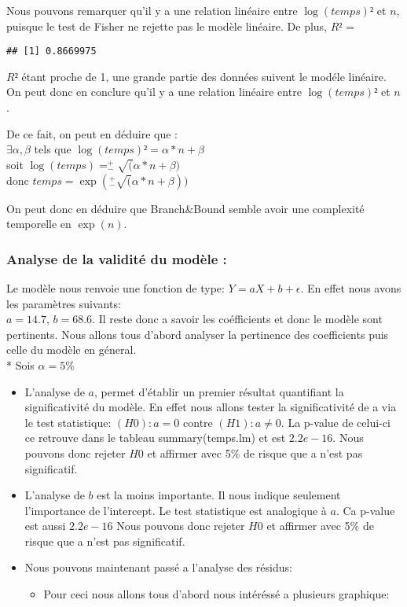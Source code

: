 \documentclass[
]{article}
\providecommand{\tightlist}{%
  \setlength{\itemsep}{0pt}\setlength{\parskip}{0pt}}
\begin{document}
Nous pouvons remarquer qu'il y a une relation linéaire entre
\(\log(temps)²\) et \(n\), puisque le test de Fisher ne rejette pas le
modèle linéaire. De plus, \(R²\) =

\begin{verbatim}
## [1] 0.8669975
\end{verbatim}

\(R²\) étant proche de 1, une grande partie des données suivent le
modéle linéaire. On peut donc en conclure qu'il y a une relation
linéaire entre \(\log(temps)²\) et \(n\).

De ce fait, on peut en déduire que :\\
\(\exists \alpha, \beta\) tels que \(\log(temps)²=\alpha*n+\beta\)\\
soit \(\log(temps)=^+_-\sqrt(\alpha*n+\beta)\)\\
donc \(temps=\exp(^+_-\sqrt(\alpha*n+\beta))\)

On peut donc en déduire que Branch\&Bound semble avoir une complexité
temporelle en \(\exp(n)\).

\hypertarget{analyse-de-la-validituxe9-du-moduxe8le}{%
\subsubsection{Analyse de la validité du modèle
:}\label{analyse-de-la-validituxe9-du-moduxe8le}}

Le modèle nous renvoie une fonction de type: \(Y = aX + b + \epsilon\).
En effet nous avons les paramètres suivants:\\
\(a = 14.7\), \(b = 68.6\). Il reste donc a savoir les coéfficients et
donc le modèle sont pertinents. Nous allons tous d'abord analyser la
pertinence des coefficients puis celle du modèle en géneral.\\
* Sois \(\alpha = 5\%\)

\begin{itemize}
\tightlist
\item
  L'analyse de \(a\), permet d'établir un premier résultat quantifiant
  la significativité du modèle. En effet nous allons tester la
  significativité de a via le test statistique: \((H0) : a = 0\) contre
  \((H1) : a \neq 0\). La p-value de celui-ci ce retrouve dans le
  tableau summary(temps.lm) et est \(2.2e-16\). Nous pouvons donc
  rejeter \(H0\) et affirmer avec 5\% de risque que a n'est pas
  significatif.
\item
  L'analyse de \(b\) est la moins importante. Il nous indique seulement
  l'importance de l'intercept. Le test statistique est analogique à
  \(a\). Ca p-value est aussi \(2.2e-16\) Nous pouvons donc rejeter
  \(H0\) et affirmer avec 5\% de risque que a n'est pas significatif.\\
\item
  Nous pouvons maintenant passé a l'analyse des résidus:

  \begin{itemize}
  \tightlist
  \item
    Pour ceci nous allons tous d'abord nous intéréssé a plusieurs
    graphique:
  \end{itemize}
\end{itemize}
\end{document}
